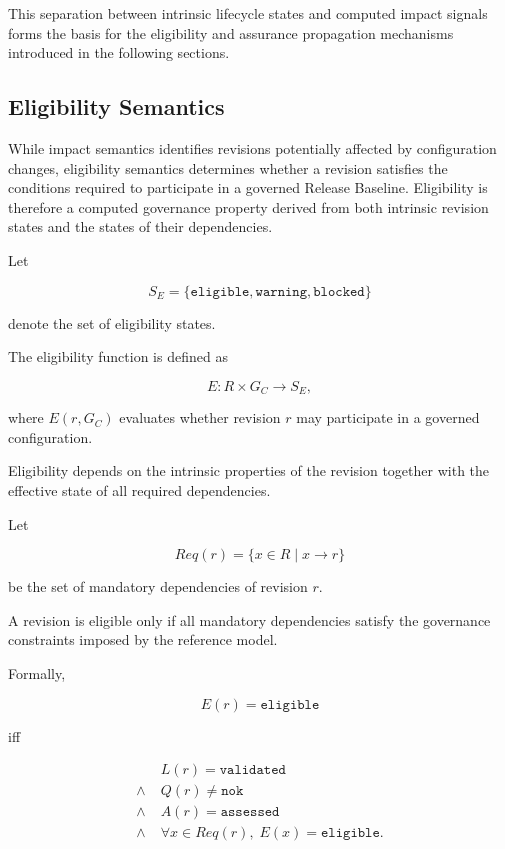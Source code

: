 \documentclass[10pt]{article}
\begin{document}
This separation between intrinsic lifecycle states and computed impact signals forms the basis for the eligibility and assurance propagation mechanisms introduced in the following sections.

\subsection{Eligibility Semantics}
\label{sec:eligibility_semantics}

While impact semantics identifies revisions potentially affected by configuration changes, eligibility semantics determines whether a revision satisfies the conditions required to participate in a governed Release Baseline. Eligibility is therefore a computed governance property derived from both intrinsic revision states and the states of their dependencies.

Let

\[
S_E=
\{
\texttt{eligible},
\texttt{warning},
\texttt{blocked}
\}
\]

denote the set of eligibility states.

The eligibility function is defined as

\[
E:R\times G_C\rightarrow S_E,
\]

where \(E(r,G_C)\) evaluates whether revision \(r\) may participate in a governed configuration.

Eligibility depends on the intrinsic properties of the revision together with the effective state of all required dependencies.

Let

\[
Req(r)
=
\{
x\in R
\mid
x
\rightarrow
r
\}
\]

be the set of mandatory dependencies of revision \(r\).

A revision is eligible only if all mandatory dependencies satisfy the governance constraints imposed by the reference model.

Formally,

\[
E(r)=
\texttt{eligible}
\]

iff

\[
\begin{aligned}
&
L(r)=\texttt{validated}
\\
\land\;&
Q(r)\neq\texttt{nok}
\\
\land\;&
A(r)=\texttt{assessed}
\\
\land\;&
\forall x\in Req(r),
\;
E(x)=\texttt{eligible}.
\end{aligned}
\]
\end{document}
